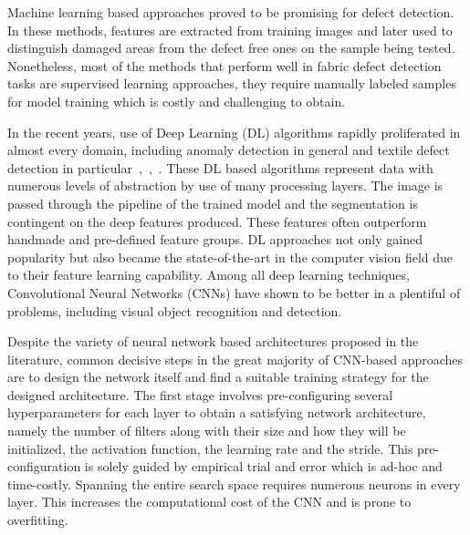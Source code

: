 \documentclass[3p,,preprint,review,12pt]{elsarticle}
\begin{document}
Machine learning based approaches proved to be promising for defect detection. In these methods, features are extracted from training images and later used to distinguish damaged areas from the defect free ones on the sample being tested. Nonetheless, most of the methods that perform well in fabric defect detection tasks are supervised learning approaches, they require manually labeled samples for model training which is costly and challenging to obtain.

In the recent years, use of Deep Learning (DL) algorithms rapidly proliferated in almost every domain, including anomaly detection in general and textile defect detection in particular\unskip~\cite{981091:21201220},\unskip~\cite{981091:21201222},\unskip~\cite{981091:21201221}. These DL based algorithms represent data with numerous levels of abstraction by use of many processing layers. The image is passed through the pipeline of the trained model and the segmentation is contingent on the deep features produced. These features often outperform handmade and pre-defined feature groups. DL approaches not only gained popularity but also became the state-of-the-art in the computer vision field due to their feature learning capability. Among all deep learning techniques, Convolutional Neural Networks (CNNs) have shown to be better in a plentiful of problems, including visual object recognition and detection. 

Despite the variety of neural network based architectures proposed in the literature, common decisive steps in the great majority of CNN-based approaches are to design the network itself and find a suitable training strategy for the designed architecture. The first stage involves pre-configuring several hyperparameters for each layer to obtain a satisfying network architecture, namely the number of filters along with their size and how they will be initialized, the activation function, the learning rate and the stride. This pre-configuration is solely guided by empirical trial and error which is ad-hoc and time-costly. Spanning the entire search space requires numerous neurons in every layer. This increases the computational cost of the CNN and is prone to overfitting.
\end{document}
